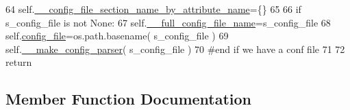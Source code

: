 \begin{DoxyCode}
64         self.\hyperlink{classnegui_1_1pginputsimupop_1_1PGInputSimuPop_acd9740f17e53a6e471d4e85565962369}{\_\_config\_file\_section\_name\_by\_attribute\_name}=\{\}
65 
66         \textcolor{keywordflow}{if} s\_config\_file \textcolor{keywordflow}{is} \textcolor{keywordflow}{not} \textcolor{keywordtype}{None}:
67             self.\hyperlink{classnegui_1_1pginputsimupop_1_1PGInputSimuPop_ad7c3feef55c16989a35f56c3e0d9943e}{\_\_full\_config\_file\_name}=s\_config\_file
68             self.\hyperlink{classnegui_1_1pginputsimupop_1_1PGInputSimuPop_af82bde7e564aee524fc30f2e06fde934}{config\_file}=os.path.basename( s\_config\_file )
69             self.\hyperlink{classnegui_1_1pginputsimupop_1_1PGInputSimuPop_a0b34c99730e86de268c5503ed226d15e}{\_\_make\_config\_parser}( s\_config\_file )
70         \textcolor{comment}{#end if we have a conf file}
71 
72         \textcolor{keywordflow}{return}
\end{DoxyCode}


\subsection{Member Function Documentation}
